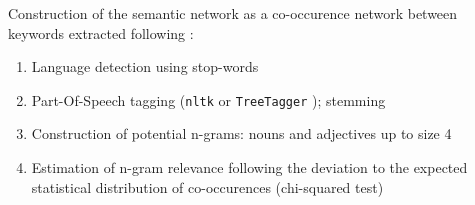 {Construction of the semantic network as a co-occurence network between keywords extracted following \cite{bergeaud2017classifying}:

\medskip

\begin{enumerate}
	\item Language detection using stop-words \cite{baldwin2010language}
	\item Part-Of-Speech tagging (\texttt{nltk} or \texttt{TreeTagger} \cite{schmid1994probabilistic}); stemming
	\item Construction of potential n-grams: nouns and adjectives up to size 4
	\item Estimation of n-gram relevance following the deviation to the expected statistical distribution of co-occurences (chi-squared test)
\end{enumerate}



}

